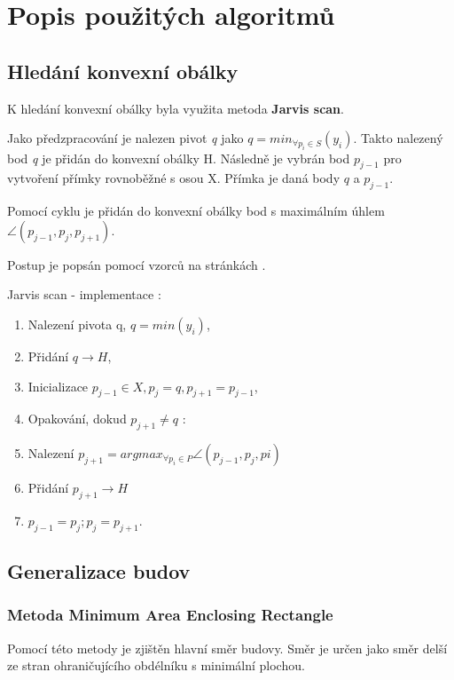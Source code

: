 \documentclass[oneside,12pt,a4paper]{book}
\begin{document}
\chapter{Popis použitých algoritmů}
\label{kapitola: Popis použitých algoritmů}

\section{Hledání konvexní obálky}

K hledání konvexní obálky byla využita metoda \textbf{Jarvis scan}.\par
Jako předzpracování je nalezen pivot \emph{q} jako $q = min_{\forall p_i \in S }(y_i)$. Takto nalezený bod \emph{q} je přidán do konvexní obálky H. Následně je vybrán bod $p_{j-1}$ pro vytvoření přímky rovnoběžné s osou X. Přímka je daná body $q$ a $p_{j-1}$.\par
Pomocí cyklu je přidán do konvexní obálky bod s maximálním úhlem $\angle (p_{j-1}, p_j, p_{j+1})$.\par
Postup je popsán pomocí vzorců na stránkách \cite{plp} .

\bigskip

Jarvis scan - implementace $:$
\begin{enumerate}
\item Nalezení pivota q, $q = min(y_i)$,
\item Přidání $q \rightarrow H$,
\item Inicializace $p_{j-1} \in X, p_j = q, p_{j+1} = p_{j-1}$,
\item Opakování, dokud $p_{j+1} \neq q$ $:$
\item \quad Nalezení $p_{j+1} = arg max_{\forall p_i \in P } \angle (p_{j-1},p_j, pi)$
\item \quad Přidání $p_{j+1} \rightarrow H$
\item \quad $p_{j-1}=p_j ; p_j = p_{j+1}$.
\end{enumerate}


\section{Generalizace budov}
\subsection{Metoda Minimum Area Enclosing Rectangle}
Pomocí této metody je zjištěn hlavní směr budovy. Směr je určen jako směr delší ze stran ohraničujícího obdélníku s minimální plochou. \par
\end{document}
